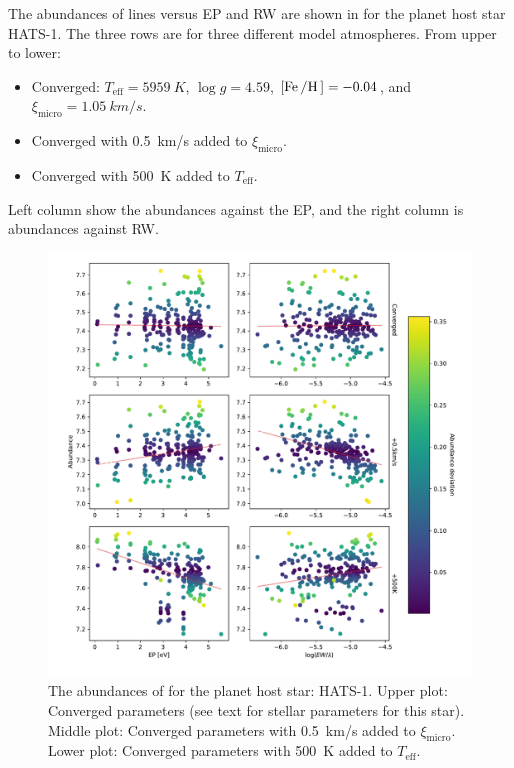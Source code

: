 The abundances of  lines versus EP and RW are shown in
 for the planet host star HATS-1. The three rows are for three
different model atmospheres. From upper to lower:
\begin{itemize}
  \item Converged: $T_\mathrm{eff}=\SI{5959}{K}$,
                   $\log g=4.59$,
                   $[\ion{Fe}/\ion{H}]=-0.04$, and
                   $\xi_\mathrm{micro}=\SI{1.05}{km/s}$.
  \item Converged with \SI{0.5}{km/s} added to $\xi_\mathrm{micro}$.
  \item Converged with \SI{500}{K} added to $T_\mathrm{eff}$.
\end{itemize}
Left column show the abundances against the EP, and the right column is
abundances against RW.

\begin{figure}[htpb!]
    \centering
    \includegraphics[width=1.0\linewidth]{figures/EP_RW_vs_abundance.pdf}
    \caption{The abundances of  for the planet host star: HATS-1.
             Upper plot: Converged parameters (see text for stellar parameters
             for this star).
             Middle plot: Converged parameters with \SI{0.5}{km/s} added to
             $\xi_\mathrm{micro}$.
             Lower plot: Converged parameters with \SI{500}{K} added to
             $T_\mathrm{eff}$.}
    \label{fig:eprw}
\end{figure}

